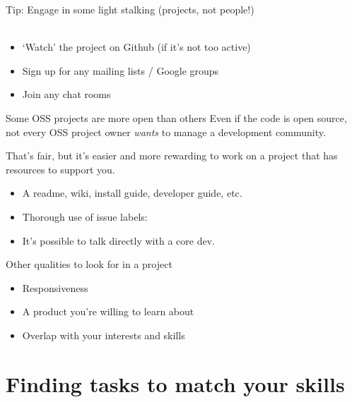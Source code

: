 \documentclass{beamer}
\begin{document}
\begin{frame}{Tip: Engage in some light stalking (projects, not people!)}
	\\
	\\
	\begin{itemize}
		\item `Watch' the project on Github (if it's not too active)
		\item Sign up for any mailing lists / Google groups
		\item Join any chat rooms
	\end{itemize}
\end{frame}


\begin{frame}{Some OSS projects are more open than others}
	Even if the code is open source, not every OSS project owner \textit{wants} to manage a development community.\\
	\vskip10pt
	
	That's fair, but it's easier and more rewarding to work on a project that has resources to support you.\\[10pt]
	
	\begin{itemize}
		\item A readme, wiki, install guide, developer guide, etc.\\
		\item Thorough use of issue labels: 
		\item It's possible to talk directly with a core dev.\\
	\end{itemize}
\end{frame}

\begin{frame}{Other qualities to look for in a project}
	\begin{itemize}
		\item Responsiveness
		\item A product you're willing to learn about
		\item Overlap with your interests and skills
	\end{itemize}
\end{frame}


\section{Finding tasks to match your skills}
\end{document}
